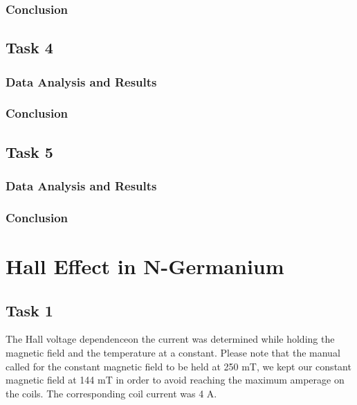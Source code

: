 \documentclass[a4paper]{article}
\begin{document}
\subsubsection{Conclusion}

\subsection{Task 4}

\subsubsection{Data Analysis and Results}

\subsubsection{Conclusion}

\subsection{Task 5}

\subsubsection{Data Analysis and Results}

\subsubsection{Conclusion}

\section{Hall Effect in N-Germanium}

\subsection{Task 1}

\qq The Hall voltage dependenceon the current was determined while
holding the magnetic field and the temperature at a constant. Please
note that the manual called for the constant magnetic field to be held
at 250 mT, we kept our constant magnetic field at 144 mT in order to
avoid reaching the maximum amperage on the coils. The corresponding
coil current was 4 A.
\end{document}

